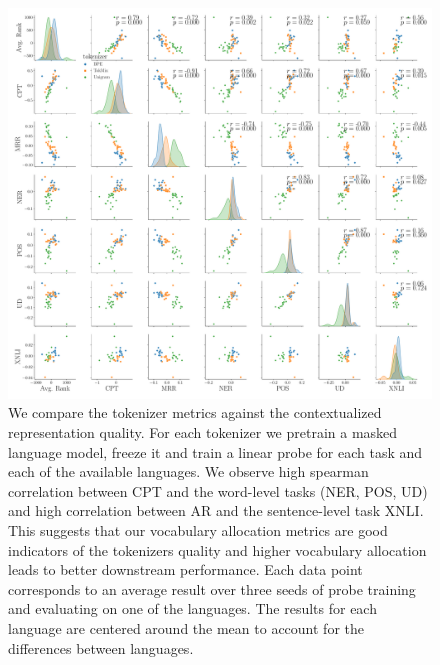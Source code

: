 \begin{figure}[H]
    \centering
    \includegraphics[width=\textwidth]{paper/figures/pair_analysis_20L.pdf}
    \caption{We compare the tokenizer metrics against the contextualized representation quality. For each tokenizer we pretrain a masked language model, freeze it and train a linear probe for each task and each of the available languages. We observe high spearman correlation between CPT and the word-level tasks (NER, POS, UD) and high correlation between AR and the sentence-level task XNLI. This suggests that our vocabulary allocation metrics are good indicators of the tokenizers quality and higher vocabulary allocation leads to better downstream performance. Each data point corresponds to an average result over three seeds of probe training and evaluating on one of the languages. The results for each language are centered around the mean to account for the differences between languages.}
    \label{fig:pair_analysis_20L}
\end{figure}

